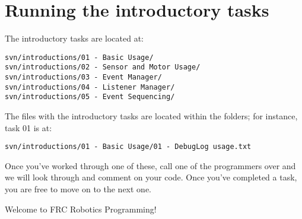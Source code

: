 \documentclass[a4paper]{article}
\begin{document}
\section{Running the introductory tasks}

The introductory tasks are located at: \begin{verbatim}svn/introductions/01 - Basic Usage/
svn/introductions/02 - Sensor and Motor Usage/
svn/introductions/03 - Event Manager/
svn/introductions/04 - Listener Manager/
svn/introductions/05 - Event Sequencing/\end{verbatim}

The files with the introductory tasks are located within the folders; for instance, task 01 is at:\begin{verbatim}svn/introductions/01 - Basic Usage/01 - DebugLog usage.txt\end{verbatim}

Once you've worked through one of these, call one of the programmers over and we will look through and comment on your code. Once you've completed a task, you are free to move on to the next one. 

Welcome to FRC Robotics Programming!
\end{document}
